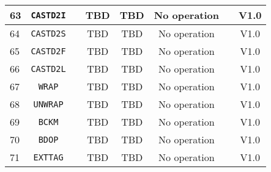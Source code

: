\documentclass{article}
\begin{document}
\begin{longtable}{|l|c|c|c|c|c|c|c|}
		63 & \texttt{CASTD2I} & & TBD & TBD & No operation & & \textsf{V1.0} \\ \hline
		64 & \texttt{CASTD2S} & & TBD & TBD & No operation & & \textsf{V1.0} \\ \hline
		65 & \texttt{CASTD2F} & & TBD & TBD & No operation & & \textsf{V1.0} \\ \hline
		66 & \texttt{CASTD2L} & & TBD & TBD & No operation & & \textsf{V1.0} \\ \hline
		67 & \texttt{WRAP} & & TBD & TBD & No operation & & \textsf{V1.0} \\ \hline
		68 & \texttt{UNWRAP} & & TBD & TBD & No operation & & \textsf{V1.0} \\ \hline
		69 & \texttt{BCKM} & & TBD & TBD & No operation & & \textsf{V1.0} \\ \hline
		70 & \texttt{BDOP} & & TBD & TBD & No operation & & \textsf{V1.0} \\ \hline
		71 & \texttt{EXTTAG} & & TBD & TBD & No operation & & \textsf{V1.0} \\ \hline

\end{longtable}
\end{document}
